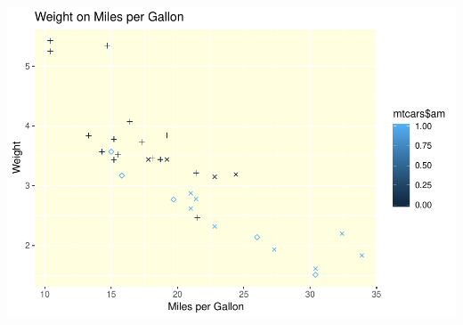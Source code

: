 \documentclass[]{article}
\begin{document}
\includegraphics{HW0_Final_files/figure-latex/unnamed-chunk-1-2.pdf}
\end{document}
